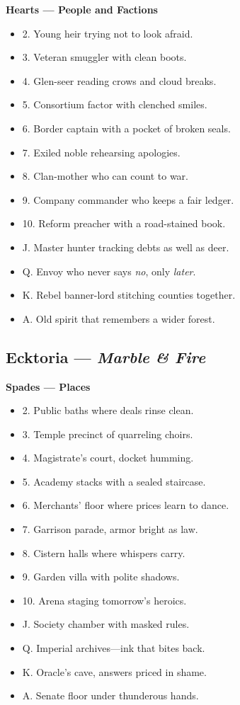 \begin{multicols}{2}
\textbf{Hearts — People and Factions}
\begin{itemize}
  \item 2. Young heir trying not to look afraid.
  \item 3. Veteran smuggler with clean boots.
  \item 4. Glen-seer reading crows and cloud breaks.
  \item 5. Consortium factor with clenched smiles.
  \item 6. Border captain with a pocket of broken seals.
  \item 7. Exiled noble rehearsing apologies.
  \item 8. Clan-mother who can count to war.
  \item 9. Company commander who keeps a fair ledger.
  \item 10. Reform preacher with a road-stained book.
  \item J. Master hunter tracking debts as well as deer.
  \item Q. Envoy who never says \emph{no}, only \emph{later}.
  \item K. Rebel banner-lord stitching counties together.
  \item A. Old spirit that remembers a wider forest.
\end{itemize}

\subsection*{Ecktoria — \textit{Marble \& Fire}}
\textbf{Spades — Places}
\begin{itemize}
  \item 2. Public baths where deals rinse clean.
  \item 3. Temple precinct of quarreling choirs.
  \item 4. Magistrate’s court, docket humming.
  \item 5. Academy stacks with a sealed staircase.
  \item 6. Merchants’ floor where prices learn to dance.
  \item 7. Garrison parade, armor bright as law.
  \item 8. Cistern halls where whispers carry.
  \item 9. Garden villa with polite shadows.
  \item 10. Arena staging tomorrow’s heroics.
  \item J. Society chamber with masked rules.
  \item Q. Imperial archives—ink that bites back.
  \item K. Oracle’s cave, answers priced in shame.
  \item A. Senate floor under thunderous hands.
\end{itemize}


\end{multicols}
